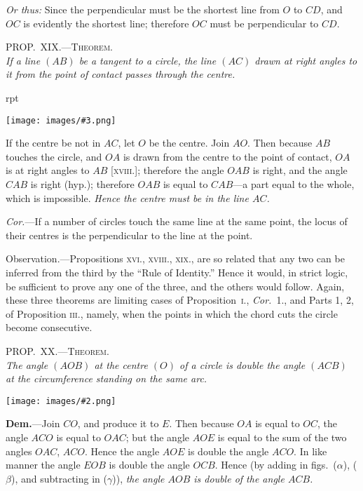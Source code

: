 \documentclass[oneside]{book}
\newcounter{wrapwidth}
\newcommand\myprop[2]{
\bigskip\Needspace*{4\baselineskip}\begin{center}\textsc{#1}\\\medskip\emph{#2}\par\end{center}
}
\newcommand\imgflow[3]{
\setcounter{wrapwidth}{#1}
\begin{wrapfigure}[#2]{r}{\value{wrapwidth}pt}
\begin{center}
\vspace{-0.3in}
\texttt{[image: images/\#3.png]}
\end{center}
\end{wrapfigure}
}
\newcommand\imgcent[2]{
\begin{center}
\texttt{[image: images/\#2.png]}
\end{center}
}
\begin{document}
\begin{footnotesize}
\emph{Or thus:} Since the perpendicular must be the shortest line
from $O$ to $CD$, and $OC$ is evidently the shortest line; therefore
$OC$ must be perpendicular to $CD$.
\end{footnotesize}

\myprop{PROP\@.~XIX\@.---Theorem.}{If a line $(AB)$ be a tangent to a circle, the line $(AC)$
drawn at right angles to it from the point of contact passes
through the centre.}

\imgflow{130}{11}{f125}

If the centre be not in $AC$, let $O$ be the centre.
Join $AO$. Then because $AB$
touches the circle, and $OA$ is
drawn from the centre to the
point of contact, $OA$ is at right
angles to $AB$ [\textsc{xviii.}]; therefore
the angle $OAB$ is right,
and the angle $CAB$ is right
(hyp.); therefore $OAB$ is equal
to $CAB$---a part equal to the
whole, which is impossible.
\emph{Hence the centre must be in the line $AC$.}


\emph{Cor.}---If a number of circles touch the same line at
the same point, the locus of their centres is the perpendicular
to the line at the point.\par\medskip

\begin{footnotesize}
\textsf{Observation.}---Propositions \textsc{xvi., xviii., xix.,} are so related
that any two can be inferred from the third by the ``Rule of
Identity.'' Hence it would, in strict logic, be sufficient to prove
any one of the three, and the others would follow. Again, these
three theorems are limiting cases of Proposition~\textsc{i.}, \emph{Cor.}~1., and
Parts 1, 2, of Proposition \textsc{iii.}, namely, when the points in which
the chord cuts the circle become consecutive.
\end{footnotesize}

\myprop{PROP\@.~XX\@.---Theorem.}{The angle $(AOB)$ at the centre $(O)$ of a circle is double
the angle $(ACB)$ at the circumference standing on the
same arc.}

\imgcent{325}{f126}

\textbf{Dem.}---Join $CO$, and produce it to $E$. Then because
$OA$ is equal to $OC$, the angle $ACO$ is equal to $OAC$;
but the angle $AOE$ is equal to the sum of the two
angles $OAC$, $ACO$. Hence the angle $AOE$ is double
the angle $ACO$. In like manner the angle $EOB$ is
double the angle $OCB$. Hence (by adding in figs.~($\alpha$),
($\beta$), and subtracting in ($\gamma$)), \emph{the angle $AOB$ is double of
the angle $ACB$.}\par\smallskip
\end{document}

